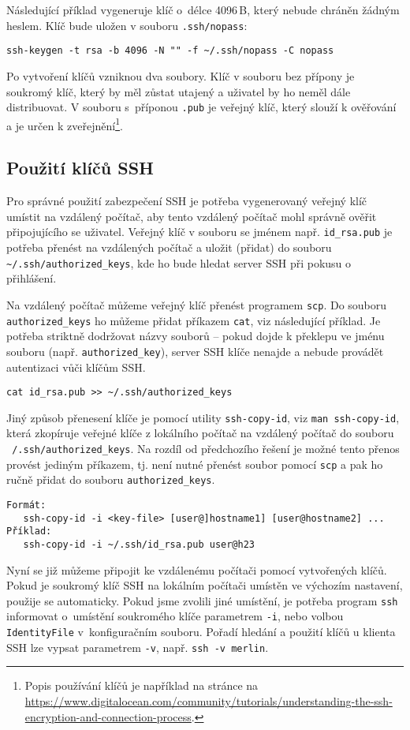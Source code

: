 Následující příklad vygeneruje klíč o~délce 4096\,B, který nebude chráněn žádným heslem. Klíč bude uložen v souboru {\tt .ssh/nopass}:
\begin{verbatim}
ssh-keygen -t rsa -b 4096 -N "" -f ~/.ssh/nopass -C nopass
\end{verbatim}

Po vytvoření klíčů vzniknou dva soubory. Klíč v souboru bez přípony je soukromý klíč, který by měl zůstat utajený a uživatel by ho neměl dále distribuovat. V souboru s~příponou {\tt .pub} je veřejný klíč, který slouží k ověřování a je určen k zveřejnění\footnote{Popis používání klíčů je například na stránce na \url{https://www.digitalocean.com/community/tutorials/understanding-the-ssh-encryption-and-connection-process}.}.

\subsection{Použití klíčů SSH}
Pro správné použití zabezpečení SSH je potřeba vygenerovaný veřejný klíč umístit na vzdálený počítač, aby tento vzdálený počítač mohl správně ověřit připojujícího se uživatel. Veřejný klíč v souboru se jménem např.  {\tt id\_rsa.pub} je potřeba přenést na vzdálených počítač a uložit (přidat) do souboru \verb| ~/.ssh/authorized_keys|, kde ho bude hledat server SSH při pokusu o přihlášení.

Na vzdálený počítač můžeme veřejný klíč přenést programem {\tt scp}. Do souboru {\tt authorized\_keys} ho můžeme přidat příkazem {\tt cat}, viz následující příklad. Je potřeba striktně dodržovat názvy souborů -- pokud dojde k překlepu ve jménu souboru (např. {\tt authorized\_key}), server SSH klíče nenajde a nebude provádět autentizaci vůči klíčům SSH. 
\begin{verbatim}
cat id_rsa.pub >> ~/.ssh/authorized_keys
\end{verbatim}

Jiný způsob přenesení klíče je pomocí utility {\tt ssh-copy-id}, viz {\tt man ssh-copy-id}, která zkopíruje veřejné klíče z lokálního počítač na vzdálený počítač do souboru {\tt ~/.ssh/authorized\_keys}. Na rozdíl od předchozího řešení je možné tento přenos provést jediným příkazem, tj. není nutné přenést soubor pomocí {\tt scp} a pak ho ručně přidat do souboru {\tt authorized\_keys}.
\begin{verbatim}
Formát:
   ssh-copy-id -i <key-file> [user@]hostname1] [user@hostname2] ...
Příklad:
   ssh-copy-id -i ~/.ssh/id_rsa.pub user@h23
\end{verbatim}

Nyní se již můžeme připojit ke vzdálenému počítači pomocí vytvořených klíčů. Pokud je soukromý klíč SSH na lokálním počítači umístěn ve výchozím nastavení, použije se automaticky. Pokud jsme  zvolili jiné umístění, je potřeba program {\tt ssh} informovat o~umístění soukromého klíče parametrem  {\tt -i}, nebo volbou {\tt IdentityFile} v~konfiguračním souboru. Pořadí hledání a použití klíčů u klienta SSH lze vypsat parametrem {\tt -v}, např. {\tt ssh -v merlin}.

